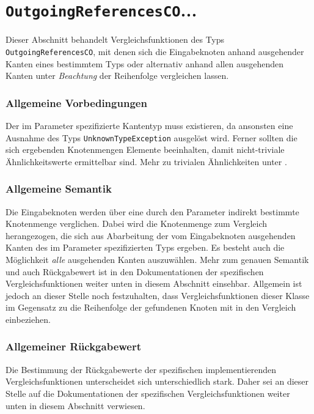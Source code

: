 %
%

\section{\texttt{OutgoingReferencesCO}...}
\label{strct:spec:outrefsco}
Dieser Abschnitt behandelt Vergleichsfunktionen des Typs \texttt{OutgoingReferencesCO}, mit denen sich die Eingabeknoten anhand ausgehender Kanten eines bestimmtem Typs oder alternativ anhand allen ausgehenden Kanten unter \emph{Beachtung} der Reihenfolge vergleichen lassen.

\subsubsection*{Allgemeine Vorbedingungen}
Der im Parameter spezifizierte Kantentyp muss existieren, da ansonsten eine Ausnahme des Typs \texttt{UnknownTypeException} ausgelöst wird. Ferner sollten die sich ergebenden Knotenmengen Elemente beeinhalten, damit nicht-triviale Ähnlichkeitswerte ermittelbar sind. Mehr zu trivialen Ähnlichkeiten unter .

\subsubsection*{Allgemeine Semantik}
Die Eingabeknoten werden über eine durch den Parameter indirekt bestimmte Knotenmenge verglichen. Dabei wird die Knotenmenge zum Vergleich herangezogen, die sich aus Abarbeitung der vom Eingabeknoten ausgehenden Kanten des im Parameter spezifizierten Typs ergeben. Es besteht auch die Möglichkeit \emph{alle} ausgehenden Kanten auszuwählen. Mehr zum genauen Semantik und auch Rückgabewert ist in den Dokumentationen der spezifischen Vergleichsfunktionen weiter unten in diesem Abschnitt einsehbar. Allgemein ist jedoch an dieser Stelle noch festzuhalten, dass Vergleichsfunktionen dieser Klasse im Gegensatz zu  die Reihenfolge der gefundenen Knoten mit in den Vergleich einbeziehen.

\subsubsection*{Allgemeiner Rückgabewert}
Die Bestimmung der Rückgabewerte der spezifischen implementierenden Vergleichsfunktionen unterscheidet sich unterschiedlich stark. Daher sei an dieser Stelle auf die Dokumentationen der spezifischen Vergleichsfunktionen weiter unten in diesem Abschnitt verwiesen.

